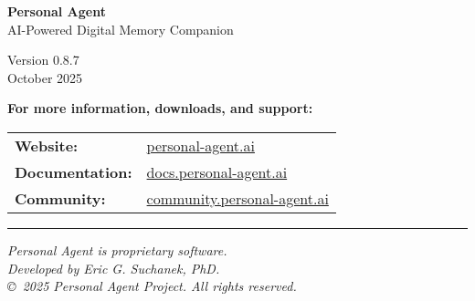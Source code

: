 \documentclass[11pt,letterpaper]{article}
\begin{document}
\begin{center}
{\Large\bfseries\color{primaryblue} Personal Agent}\\
\vspace{0.3cm}
{\large\color{secondarygreen} AI-Powered Digital Memory Companion}\\
\vspace{1cm}

Version 0.8.7 \\ October 2025\\
\vspace{1cm}

\textbf{For more information, downloads, and support:}\\
\vspace{0.5cm}
\begin{tabular}{ll}
\textbf{Website:} & \url{personal-agent.ai} \\
\textbf{Documentation:} & \url{docs.personal-agent.ai} \\
\textbf{Community:} & \url{community.personal-agent.ai} \\
\end{tabular}

\vspace{2cm}

\hrule
\vspace{0.5cm}

\textit{Personal Agent is proprietary software.}\\
\textit{Developed by Eric G. Suchanek, PhD.}\\
\vspace{0.3cm}
\textit{\copyright\ 2025 Personal Agent Project. All rights reserved.}

\end{center}
\end{document}
